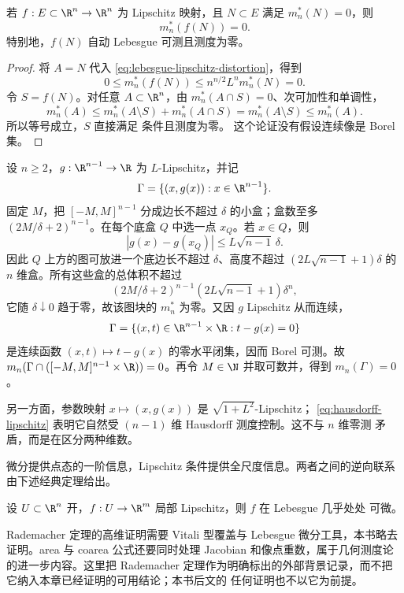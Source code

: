 \begin{theorem}[零测集保持]\label{theorem:2-4-3-2}
若 $f:E\subset\R^n\to\R^n$ 为 Lipschitz 映射，且 $N\subset E$ 满足
$m_n^*(N)=0$，则
\[
 m_n^*(f(N))=0.
\]
特别地，$f(N)$ 自动 Lebesgue 可测且测度为零。
\end{theorem}

\begin{proof}
将 $A=N$ 代入 \eqref{eq:lebesgue-lipschitz-distortion}，得到
\[
 0\le m_n^*(f(N))\le n^{n/2}L^n m_n^*(N)=0.
\]
令 $S=f(N)$。对任意 $A\subset\R^n$，由 $m_n^*(A\cap S)=0$、次可加性和单调性，
\[
 m_n^*(A)
 \le m_n^*(A\setminus S)+m_n^*(A\cap S)
 =m_n^*(A\setminus S)
 \le m_n^*(A).
\]
所以等号成立，$S$ 直接满足 \Caratheodory{} 条件且测度为零。
这个论证没有假设连续像是 Borel 集。
\end{proof}

\begin{example}[Lipschitz 图]\label{ex:2-4-3-2}
设 $n\ge2$，$g:\R^{n-1}\to\R$ 为 $L$-Lipschitz，并记
\[
 \Gamma=\{(x,g(x)):x\in\R^{n-1}\}.
\]
固定 $M$，把 $[-M,M]^{n-1}$ 分成边长不超过 $\delta$ 的小盒；盒数至多
$(2M/\delta+2)^{n-1}$。在每个底盒 $Q$ 中选一点 $x_Q$。若 $x\in Q$，则
\[
 |g(x)-g(x_Q)|\le L\sqrt{n-1}\,\delta.
\]
因此 $Q$ 上方的图可放进一个底边长不超过 $\delta$、高度不超过
$(2L\sqrt{n-1}+1)\delta$ 的 $n$ 维盒。所有这些盒的总体积不超过
\[
 (2M/\delta+2)^{n-1}(2L\sqrt{n-1}+1)\delta^n,
\]
它随 $\delta\downarrow0$ 趋于零，故该图块的 $m_n^*$ 为零。又因 $g$ Lipschitz 从而连续，
\[
 \Gamma=\{(x,t)\in\R^{n-1}\times\R:t-g(x)=0\}
\]
是连续函数 $(x,t)\mapsto t-g(x)$ 的零水平闭集，因而 Borel 可测。故
$m_n(\Gamma\cap([-M,M]^{n-1}\times\R))=0$。再令 $M\in\N$ 并取可数并，得到
$m_n(\Gamma)=0$。

另一方面，参数映射 $x\mapsto(x,g(x))$ 是 $\sqrt{1+L^2}$-Lipschitz；
\eqref{eq:hausdorff-lipschitz} 表明它自然受 $(n-1)$ 维 Hausdorff 测度控制。这不与 $n$ 维零测
矛盾，而是在区分两种维数。
\end{example}

微分提供点态的一阶信息，Lipschitz 条件提供全尺度信息。两者之间的逆向联系由下述经典定理给出。

\begin{remark}\label{theorem:2-4-3-3}
设 $U\subset\R^n$ 开，$f:U\to\R^m$ 局部 Lipschitz，则 $f$ 在 Lebesgue 几乎处处
\Frechet{} 可微。
\end{remark}

Rademacher 定理的高维证明需要 Vitali 型覆盖与 Lebesgue 微分工具，本书略去证明。area 与
coarea 公式还要同时处理 Jacobian 和像点重数，属于几何测度论的进一步内容。这里把
Rademacher 定理作为明确标出的外部背景记录，而不把它纳入本章已经证明的可用结论；本书后文的
任何证明也不以它为前提。

